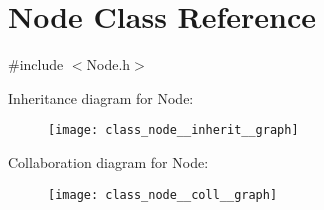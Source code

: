 \hypertarget{class_node}{}\section{Node Class Reference}
\label{class_node}


{\ttfamily \#include $<$Node.\+h$>$}



Inheritance diagram for Node\+:\nopagebreak
\begin{figure}[H]
\begin{center}
\leavevmode
\texttt{[image: class\_node\_\_inherit\_\_graph]}
\end{center}
\end{figure}


Collaboration diagram for Node\+:\nopagebreak
\begin{figure}[H]
\begin{center}
\leavevmode
\texttt{[image: class\_node\_\_coll\_\_graph]}
\end{center}
\end{figure}
